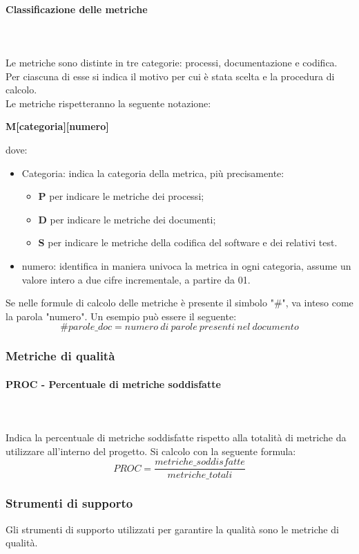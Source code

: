 \paragraph{Classificazione delle metriche} \mbox{} \\  \mbox{} \\ 
Le metriche sono distinte in tre categorie: processi, documentazione e codifica. Per ciascuna di esse si indica il motivo per cui è stata scelta e la procedura di calcolo.  \\
Le metriche rispetteranno la seguente notazione: \\
\centerline{\textbf{M[categoria][numero]}}
dove: \begin{itemize}
\item Categoria: indica la categoria della metrica, più precisamente:
\begin{itemize}
\item \textbf{P} per indicare le metriche dei processi;
\item \textbf{D} per indicare le metriche dei documenti;
\item \textbf{S} per indicare le metriche della codifica del software e dei relativi test.
\end{itemize}
\item numero: identifica in maniera univoca la metrica in ogni categoria, assume un valore intero a due cifre incrementale, a partire da 01.
\end{itemize}
Se nelle formule di calcolo delle metriche è presente il simbolo "\#", va inteso come la parola "numero". Un esempio può essere il seguente:
\[ \#parole\_doc = numero\ di\ parole\ presenti\ nel\ documento \]

\subsubsection{Metriche di qualità}
\paragraph*{PROC - Percentuale di metriche soddisfatte}\mbox{} \\ \mbox{} \\ 
Indica la percentuale di metriche soddisfatte rispetto alla totalità di metriche da utilizzare all’interno del progetto. Si calcolo con la seguente formula:
\[ PROC = \frac{metriche\_soddisfatte}{metriche\_totali} \]

\subsubsection{Strumenti di supporto}
Gli strumenti di supporto utilizzati per garantire la qualità sono le metriche di qualità.


